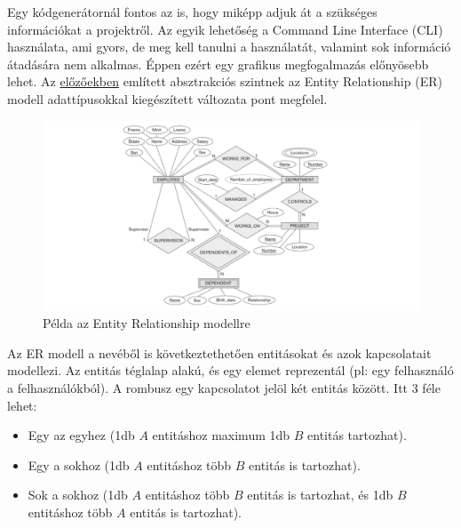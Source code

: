 \documentclass[a4paper,12pt,oneside]{report}
\begin{document}
\begin{justify}

	Egy kódgenerátornál fontos az is, hogy miképp adjuk át a szükséges információkat a projektről. Az egyik lehetőség a Command Line Interface (CLI) használata, ami gyors, de meg kell tanulni a használatát, valamint sok információ átadására nem alkalmas. Éppen ezért egy grafikus megfogalmazás előnyösebb lehet. Az \hyperref[sec:abstraction_level]{előzőekben} említett absztrakciós szintnek az Entity Relationship (ER) modell adattípusokkal kiegészített változata pont megfelel.

	\begin{figure}[h]
		\includegraphics[width=\textwidth]{contents/images/ermodell_example.png}
		\caption{Példa az Entity Relationship modellre \cite{website:example_of_er} }
		\label{fig:ermodell_example}
	\end{figure}

    Az ER modell a nevéből is következtethetően entitásokat és azok kapcsolatait modellezi. Az entitás téglalap alakú, és egy elemet reprezentál (pl: egy felhasználó a felhasználókból). A rombusz egy kapcsolatot jelöl két entitás között. Itt 3 féle lehet:

    \begin{itemize}
        \item Egy az egyhez (1db $A$ entitáshoz maximum 1db $B$ entitás tartozhat).
        \item Egy a sokhoz (1db $A$ entitáshoz több $B$ entitás is tartozhat).
        \item Sok a sokhoz (1db $A$ entitáshoz több $B$ entitás is tartozhat, és 1db $B$ entitáshoz több $A$ entitás is tartozhat).
    \end{itemize}
\end{justify}
\end{document}
